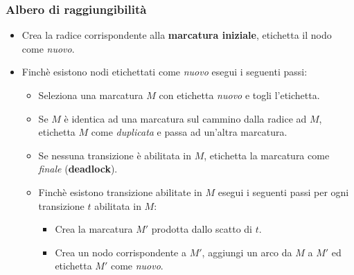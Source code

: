 \documentclass[12pt, twoside, letterpaper]{article}
\begin{document}
			\subsubsection{Albero di raggiungibilità}
				\begin{itemize}
					\item Crea la radice corrispondente alla \textbf{marcatura iniziale}, etichetta il nodo come \textit{nuovo}.
					\item Finchè esistono nodi etichettati come \textit{nuovo} esegui i seguenti passi:
						\begin{itemize}
							\item Seleziona una marcatura $M$ con etichetta \textit{nuovo} e togli l'etichetta.	
							\item Se $M$ è identica ad una marcatura sul cammino dalla radice ad $M$, etichetta $M$ come \textit{duplicata} e passa ad un'altra marcatura.
							\item Se nessuna transizione è abilitata in $M$, etichetta la marcatura come \textit{finale} (\textbf{deadlock}).
							\item Finchè esistono transizione abilitate in $M$ esegui i seguenti passi per ogni transizione $t$ abilitata in $M$:
								\begin{itemize}
									\item Crea la marcatura $M'$ prodotta dallo scatto di $t$.
									\item Crea un nodo corrispondente a $M'$, aggiungi un arco da $M$ a $M'$ ed etichetta $M'$ come \textit{nuovo}.
								\end{itemize}
						\end{itemize}
				\end{itemize}
				
\end{document}
